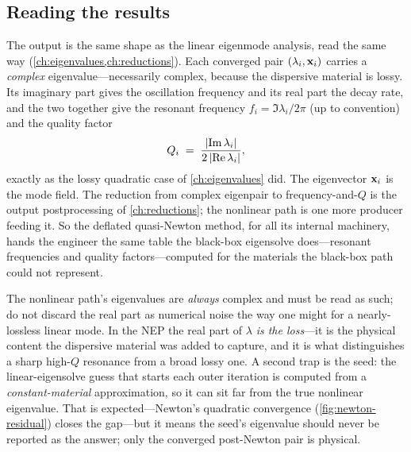 \subsection{Reading the results}
\label{sec:def-results}

The output is the same shape as the linear eigenmode analysis, read the same way
(\cref{ch:eigenvalues,ch:reductions}). Each converged pair $(\lambda_i,\mathbf{x}_i)$
carries a \emph{complex} eigenvalue---necessarily complex, because the dispersive
material is lossy. Its imaginary part gives the oscillation frequency and its real
part the decay rate, and the two together give the resonant frequency
$f_i=\Im\lambda_i/2\pi$ (up to convention) and the quality factor
\begin{equation}
  Q_i \;=\; \frac{\lvert\operatorname{Im}\lambda_i\rvert}{2\,\lvert\operatorname{Re}\lambda_i\rvert},
\end{equation}
exactly as the lossy quadratic case of \cref{ch:eigenvalues} did. The eigenvector
$\mathbf{x}_i$ is the mode field. The reduction from complex eigenpair to
frequency-and-$Q$ is the output postprocessing of \cref{ch:reductions}; the
nonlinear path is one more producer feeding it. So the deflated quasi-Newton
method, for all its internal machinery, hands the engineer the same table the
black-box eigensolve does---resonant frequencies and quality factors---computed
for the materials the black-box path could not represent.

\begin{pitfall}
The nonlinear path's eigenvalues are \emph{always} complex and must be read as
such; do not discard the real part as numerical noise the way one might for a
nearly-lossless linear mode. In the NEP the real part of $\lambda$ \emph{is the
loss}---it is the physical content the dispersive material was added to capture,
and it is what distinguishes a sharp high-$Q$ resonance from a broad lossy one.
A second trap is the seed: the linear-eigensolve guess that starts each outer
iteration is computed from a \emph{constant-material} approximation, so it can sit
far from the true nonlinear eigenvalue. That is expected---Newton's quadratic
convergence (\cref{fig:newton-residual}) closes the gap---but it means the seed's
eigenvalue should never be reported as the answer; only the converged
post-Newton pair is physical.
\end{pitfall}

